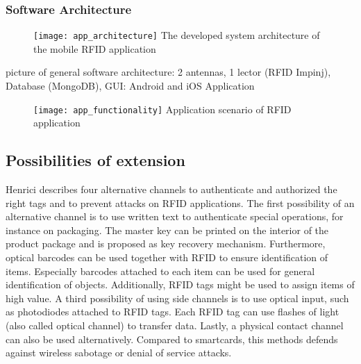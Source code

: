 \subsubsection{Software Architecture}

\begin{figure}
\centering
\texttt{[image: app\_architecture]} The developed system architecture of the mobile RFID application
\caption{\label{fig:apparchitecture}} 
\end{figure}

picture of general software architecture: 
2 antennas, 1 lector (RFID Impinj), Database (MongoDB), GUI: Android and  iOS Application 


\begin{figure}
\centering
\texttt{[image: app\_functionality]} Application scenario of RFID application 
\caption{\label{fig:appfunctionality}} 
\end{figure}

\subsection{Possibilities of extension}

Henrici \cite[p.121 ff.]{henrici} describes four alternative channels to authenticate and authorized the right tags and to prevent attacks on RFID applications. 
The first possibility of an alternative channel is to use written text to authenticate special operations, for instance on packaging. The master key can be printed on the interior of the product package and is proposed as key recovery mechanism.
Furthermore, optical barcodes can be used together with RFID to ensure identification of items. Especially barcodes attached to each item can be used for general identification of objects. Additionally, RFID tags might be used to assign items of high value.
A third possibility of using side channels is to use optical input, such as photodiodes attached to RFID tags. Each RFID tag can use flashes of light (also called optical channel) to transfer data.   
Lastly, a physical contact channel can also be used alternatively. Compared to smartcards, this methods defends against wireless sabotage or denial of service attacks.


















 
